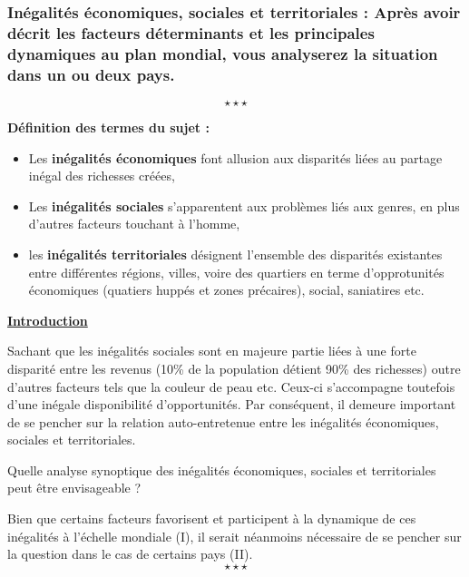 \newpage \begin{center}
	\subsubsection*{Inégalités économiques, sociales et territoriales : Après avoir décrit les facteurs déterminants et les principales dynamiques au plan mondial, vous analyserez la situation dans un ou deux pays.}
\end{center}
$$\star \star \star$$

\noindent \textbf{Définition des termes du sujet :}

\begin{itemize}
	\item Les \textbf{inégalités économiques} font allusion aux disparités liées au partage inégal des richesses créées,
	\item Les \textbf{inégalités sociales} s'apparentent aux problèmes liés aux genres, en plus d'autres facteurs touchant à l'homme,
	\item les \textbf{inégalités territoriales} désignent l'ensemble des disparités existantes entre différentes régions, villes, voire des quartiers en terme d'opprotunités économiques (quatiers huppés et zones précaires), social, saniatires etc.
\end{itemize}

\begin{center}
	\textbf{\underline{Introduction}} 
\end{center}

Sachant que les inégalités sociales sont en majeure partie liées à une forte disparité entre les revenus (10\% de la population détient 90\% des richesses) outre d'autres facteurs tels que la couleur de peau etc. Ceux-ci s'accompagne toutefois d'une inégale disponibilité d'opportunités. Par conséquent, il demeure important de se pencher sur la relation auto-entretenue entre les inégalités économiques, sociales et territoriales.

Quelle analyse synoptique des inégalités économiques, sociales et territoriales peut être envisageable ? \newline

Bien que certains facteurs favorisent et participent à la dynamique de ces inégalités à l'échelle mondiale (I), il serait néanmoins nécessaire de se pencher sur la question dans le cas de certains pays (II). $$\star \star \star$$

